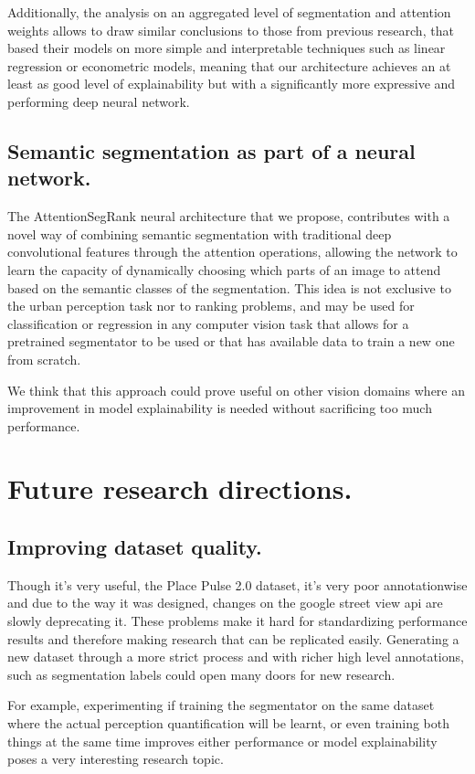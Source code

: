 Additionally, the analysis on an aggregated level of segmentation and attention weights
allows to draw similar conclusions to those from previous research, that based their models
on more simple and interpretable techniques such as linear regression or econometric models,
meaning that our architecture achieves an at least as good level of explainability
but with a significantly more expressive and performing deep neural network.

\subsection{Semantic segmentation as part of a neural network.}
The AttentionSegRank neural architecture that we propose, contributes with a novel way of combining
semantic segmentation with traditional deep convolutional features through the attention operations,
allowing the network to learn the capacity of dynamically choosing which parts of an image to attend
based on the semantic classes of the segmentation. This idea is not exclusive to the urban perception task
nor to ranking problems, and may be used for classification or regression in any computer vision task
that allows for a pretrained segmentator to be used or that has available data to train a new one from
scratch.

We think that this approach could prove useful on other vision domains where an improvement
in model explainability is needed without sacrificing too much performance.

\section{Future research directions.}

\subsection{Improving dataset quality.}
Though it's very useful, the Place Pulse 2.0 dataset, it's very poor annotationwise and due to
the way it was designed, changes on the google street view api are  slowly deprecating it. These
problems make it hard for standardizing performance results and therefore
making research that can be replicated easily. Generating a new dataset through a more strict process
and with richer high level annotations, such as segmentation labels could open many doors for new research.

For example, experimenting if training the segmentator on the same dataset where the actual perception quantification
will be learnt, or even training both things at the same time improves either performance
or model explainability poses a very interesting research topic.

